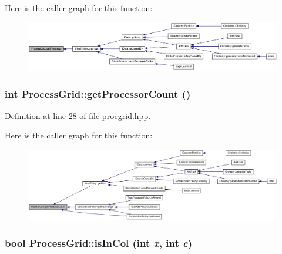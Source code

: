 Here is the caller graph for this function:\nopagebreak
\begin{figure}[H]
\begin{center}
\leavevmode
\includegraphics[width=420pt]{class_process_grid_a26a8d106c761c8989309b8ca4fed0e7a_icgraph}
\end{center}
\end{figure}
\hypertarget{class_process_grid_aba5b11a3a2274d287d46785b8752ac73}{
\subsubsection[{getProcessorCount}]{\setlength{\rightskip}{0pt plus 5cm}int ProcessGrid::getProcessorCount ()}}
\label{class_process_grid_aba5b11a3a2274d287d46785b8752ac73}


Definition at line 28 of file procgrid.hpp.

Here is the caller graph for this function:\nopagebreak
\begin{figure}[H]
\begin{center}
\leavevmode
\includegraphics[width=420pt]{class_process_grid_aba5b11a3a2274d287d46785b8752ac73_icgraph}
\end{center}
\end{figure}
\hypertarget{class_process_grid_ab8954e1d54e14023558d57dc2f84953c}{
\subsubsection[{isInCol}]{\setlength{\rightskip}{0pt plus 5cm}bool ProcessGrid::isInCol (int {\em x}, \/  int {\em c})}}
\label{class_process_grid_ab8954e1d54e14023558d57dc2f84953c}


